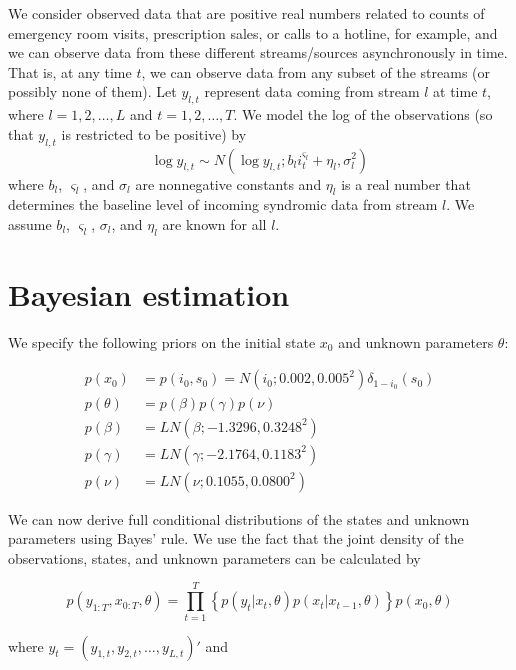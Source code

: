 \documentclass{article}
\begin{document}
We consider observed data that are positive real numbers related to counts of emergency room visits, prescription sales, or calls to a hotline, for example, and we can observe data from these different streams/sources asynchronously in time. That is, at any time $t$, we can observe data from any subset of the streams (or possibly none of them). Let $y_{l,t}$ represent data coming from stream $l$ at time $t$, where $l = 1,2,\ldots,L$ and $t = 1,2,\ldots,T$. We model the log of the observations (so that $y_{l,t}$ is restricted to be positive) by
\begin{equation}
\log y_{l,t} \sim N\left(\log y_{l,t};b_li_t^{\varsigma_l} + \eta_l,\sigma_l^2\right) \label{eqn:obs}
\end{equation}
where $b_l$, $\varsigma_l$, and $\sigma_l$ are nonnegative constants and $\eta_l$ is a real number that determines the baseline level of incoming syndromic data from stream $l$. We assume $b_l$, $\varsigma_l$, $\sigma_l$, and $\eta_l$ are known for all $l$.

\section{Bayesian estimation}

We specify the following priors on the initial state $x_0$ and unknown parameters $\theta$:

\begin{align*}
p(x_0) &= p(i_0,s_0) = N(i_0;0.002,0.005^2)\delta_{1 - i_0}(s_0) \\
p(\theta) &= p(\beta)p(\gamma)p(\nu) \\
p(\beta) &= LN(\beta;-1.3296,0.3248^2) \\
p(\gamma) &= LN(\gamma;-2.1764,0.1183^2) \\
p(\nu) &= LN(\nu;0.1055,0.0800^2)
\end{align*}

We can now derive full conditional distributions of the states and unknown parameters using Bayes' rule. We use the fact that the joint density of the observations, states, and unknown parameters can be calculated by

\begin{equation}
p(y_{1:T},x_{0:T},\theta) = \prod_{t = 1}^T \left\{p(y_t|x_t,\theta)p(x_t|x_{t-1},\theta)\right\}p(x_0,\theta) \label{eqn:joint}
\end{equation}

\noindent where $y_t = (y_{1,t},y_{2,t},\ldots,y_{L,t})'$ and
\end{document}
